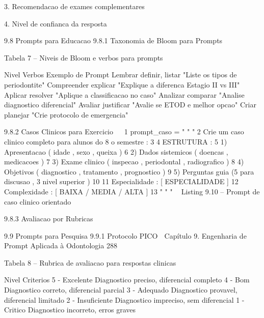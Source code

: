         3. Recomendacao de exames complementares

        4. Nivel de confianca da resposta


  9.8     Prompts para Educacao
  9.8.1    Taxonomia de Bloom para Prompts

                       Tabela 7 – Niveis de Bloom e verbos para prompts

               Nivel           Verbos            Exemplo de Prompt
               Lembrar         definir, listar   "Liste os tipos de periodontite"
               Compreender     explicar          "Explique a diferenca Estagio II vs III"
               Aplicar         resolver          "Aplique a classificacao no caso"
               Analizar        comparar          "Analise diagnostico diferencial"
               Avaliar         justificar        "Avalie se ETOD e melhor opcao"
               Criar           planejar          "Crie protocolo de emergencia"



  9.8.2    Casos Clinicos para Exercicio
                                                                                                 
 1 prompt_caso = " " "
 2 Crie um caso clinico completo para alunos do 8 o semestre :
 3
 4 ESTRUTURA :
 5 1) Apresentacao ( idade , sexo , queixa )
 6 2) Dados sistemicos ( doencas , medicacoes )
 7 3) Exame clinico ( inspecao , periodontal , radiografico )
 8 4) Objetivos ( diagnostico , tratamento , prognostico )
 9 5) Perguntas guia (5 para discusao , 3 nivel superior )
10
11 Especialidade : [ ESPECIALIDADE ]
12 Complexidade : [ BAIXA / MEDIA / ALTA ]
13 " " "
                                                                                                 
                        Listing 9.10 – Prompt de caso clinico orientado


  9.8.3    Avaliacao por Rubricas

  9.9     Prompts para Pesquisa
  9.9.1    Protocolo PICO
  Capítulo 9. Engenharia de Prompt Aplicada à Odontologia                           288


                  Tabela 8 – Rubrica de avaliacao para respostas clinicas

                    Nivel              Criterios
                    5 - Excelente      Diagnostico preciso, diferencial completo
                    4 - Bom            Diagnostico correto, diferencial parcial
                    3 - Adequado       Diagnostico provavel, diferencial limitado
                    2 - Insuficiente   Diagnostico impreciso, sem diferencial
                    1 - Critico        Diagnostico incorreto, erros graves


